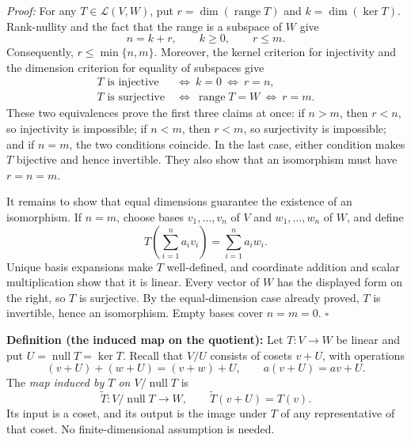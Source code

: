\documentclass[a4paper,11pt,abstract=true]{scrartcl}
\theoremstyle{dotlessP}
\theoremstyle{dotlessS}
\theoremstyle{remark}
\theoremstyle{definition}
\begin{document}
\begin{claim_box}

\textit{Proof:} For any $T\in\mathcal{L}(V,W)$, put
$r=\dim(\operatorname{range}T)$ and $k=\dim(\ker T)$.
Rank-nullity and the fact that the range is a subspace of $W$ give
\[
n=k+r,\qquad k\geq0,\qquad r\leq m.
\]
Consequently, $r\leq\min\{n,m\}$. Moreover, the kernel criterion for
injectivity and the dimension criterion for equality of subspaces give
\[
\begin{aligned}
T\text{ is injective}&\ \Longleftrightarrow\ k=0
\ \Longleftrightarrow\ r=n,\\
T\text{ is surjective}&\ \Longleftrightarrow\
\operatorname{range}T=W\ \Longleftrightarrow\ r=m.
\end{aligned}
\]
These two equivalences prove the first three claims at once: if $n>m$,
then $r<n$, so injectivity is impossible; if $n<m$, then $r<m$, so
surjectivity is impossible; and if $n=m$, the two conditions coincide.
In the last case, either condition makes $T$ bijective and hence
invertible. They also show that an isomorphism must have $r=n=m$.

It remains to show that equal dimensions guarantee the existence of
an isomorphism. If $n=m$, choose bases $v_1,\ldots,v_n$ of $V$ and
$w_1,\ldots,w_n$ of $W$, and define
\[
T\left(\sum_{i=1}^n a_i v_i\right)=\sum_{i=1}^n a_i w_i.
\]
Unique basis expansions make $T$ well-defined, and coordinate addition
and scalar multiplication show that it is linear. Every vector of $W$
has the displayed form on the right, so $T$ is surjective. By the
equal-dimension case already proved, $T$ is invertible, hence an
isomorphism. Empty bases cover $n=m=0$. \hfill$\square$
\end{claim_box}

\begin{claim_box}
\textbf{Definition (the induced map on the quotient):} Let
$T:V\longrightarrow W$ be linear and put $U=\operatorname{null}T=\ker T$.
Recall that $V/U$ consists of cosets $v+U$, with operations
\[
(v+U)+(w+U)=(v+w)+U,\qquad a(v+U)=av+U.
\]
The \emph{map induced by $T$ on $V/\operatorname{null}T$} is
\[
\widetilde{T}:V/\operatorname{null}T\longrightarrow W,
\qquad \widetilde{T}(v+U)=T(v).
\]
Its input is a coset, and its output is the image under $T$ of any
representative of that coset. No finite-dimensional assumption is needed.
\end{claim_box}
\end{document}

